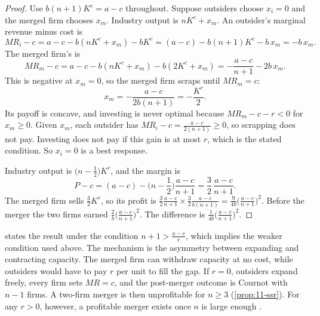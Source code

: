 \begin{proof}
Use $b(n + 1)K^c = a - c$ throughout. Suppose outsiders choose $x_i = 0$ and the merged firm chooses $x_m$. Industry
output is $nK^c + x_m$. An outsider's marginal revenue minus cost is
\begin{equation*}
\mathit{MR}_i - c = a - c - b(nK^c + x_m) - bK^c = (a - c) - b(n + 1)K^c - b\,x_m = -b\,x_m .
\end{equation*}
The merged firm's is
\begin{equation*}
\mathit{MR}_m - c = a - c - b(nK^c + x_m) - b(2K^c + x_m) = -\frac{a - c}{n + 1} - 2b\,x_m .
\end{equation*}
This is negative at $x_m = 0$, so the merged firm scraps until $\mathit{MR}_m = c$:
\begin{equation*}
x_m = -\frac{a - c}{2b(n + 1)} = -\frac{K^c}{2}.
\end{equation*}
Its payoff is concave, and investing is never optimal because $\mathit{MR}_m - c - r < 0$ for $x_m \ge 0$. Given
$x_m$, each outsider has $\mathit{MR}_i - c = \frac{a - c}{2(n + 1)} \ge 0$, so scrapping does not pay. Investing
does not pay if this gain is at most $r$, which is the stated condition. So $x_i = 0$ is a best response.

Industry output is $\big(n - \frac{1}{2}\big)K^c$, and the margin is
\begin{equation*}
P - c = (a - c) - \Big(n - \frac{1}{2}\Big)\frac{a - c}{n + 1} = \frac{3}{2}\,\frac{a - c}{n + 1}.
\end{equation*}
The merged firm sells $\frac{3}{2}K^c$, so its profit is $\frac{3}{2}\frac{a - c}{n + 1}\times\frac{3}{2}\frac{a - c}{b(n
+ 1)} = \frac{9}{4b}\big(\frac{a - c}{n + 1}\big)^2$. Before the merger the two firms earned $\frac{2}{b}\big(\frac{a -
c}{n + 1}\big)^2$. The difference is $\frac{1}{4b}\big(\frac{a - c}{n + 1}\big)^2$.
\end{proof}

\citet[Remark 3]{Pesendorfer2003} states the result under the condition $n + 1 > \frac{a - c}{r}$, which implies the
weaker condition used above. The mechanism is the asymmetry between expanding and contracting capacity. The merged firm
can withdraw capacity at no cost, while outsiders would have to pay $r$ per unit to fill the gap. If $r = 0$, outsiders
expand freely, every firm sets $\mathit{MR} = c$, and the post-merger outcome is Cournot with $n - 1$ firms. A
two-firm merger is then unprofitable for $n \ge 3$ (\cref{prop:11-ssr}). For any $r > 0$, however, a profitable merger
exists once $n$ is large enough \citep[p.~7, n.~6]{Pesendorfer2003}.

